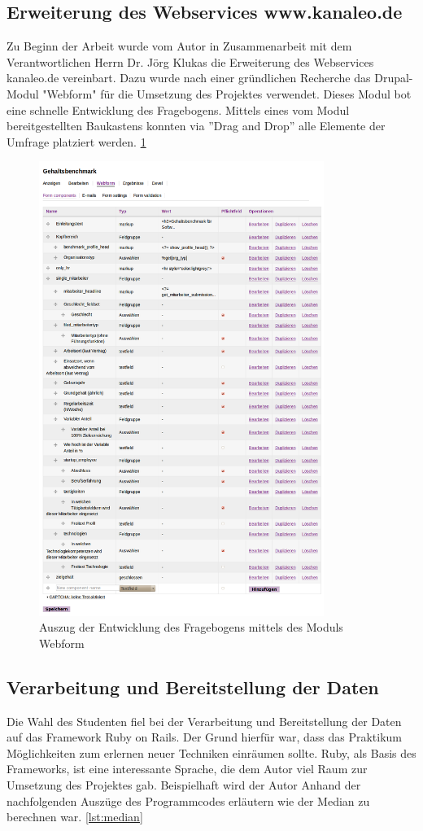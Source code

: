 \subsection{Erweiterung des Webservices www.kanaleo.de}
Zu Beginn der Arbeit wurde vom Autor in Zusammenarbeit mit dem Verantwortlichen
Herrn Dr. Jörg Klukas die Erweiterung des Webservices kanaleo.de
vereinbart. Dazu wurde nach einer gründlichen Recherche das Drupal-Modul
"Webform" für die Umsetzung des Projektes verwendet. Dieses Modul bot eine
schnelle Entwicklung des Fragebogens. Mittels eines vom Modul bereitgestellten
Baukastens konnten via ''Drag and Drop'' alle Elemente der Umfrage platziert
werden. \ref{fig: Fragebogen edit}
\begin{figure}[htbp]
 \centering
 \includegraphics[width=350px]{./material/gehaltsformedit.png}
 \caption{Auszug der Entwicklung des Fragebogens mittels des Moduls Webform}
 \label{fig: Fragebogen edit}
\end{figure}
\newpage
\subsection{Verarbeitung und Bereitstellung der Daten}
Die Wahl des Studenten fiel bei der Verarbeitung und Bereitstellung der Daten
auf das Framework Ruby on Rails. Der Grund hierfür war, dass das Praktikum
Möglichkeiten zum erlernen neuer Techniken einräumen sollte. Ruby, als Basis
des Frameworks, ist eine interessante Sprache, die dem Autor viel Raum zur
Umsetzung des Projektes gab. Beispielhaft wird der Autor Anhand der nachfolgenden Auszüge des Programmcodes erläutern wie der Median zu berechnen war. \ref{lst:median}

